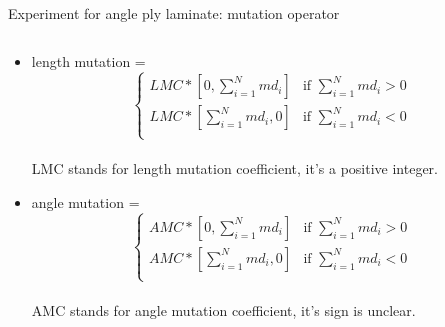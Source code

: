 \documentclass{beamer}
\begin{document}
\begin{frame}{Experiment for angle ply laminate: mutation operator}
    \begin{columns}[c]
	\begin{column}{1\textwidth}
		\begin{itemize}
			\item length mutation =  
				\[
				  \begin{cases}
					  LMC*[0, \sum_{i=1}^{N}{md_i}] & \text{if $\sum_{i=1}^{N}{md_i} > 0$} \\
					  LMC*[\sum_{i=1}^{N}{md_i}, 0] & \text{if $\sum_{i=1}^{N}{md_i} < 0$} \\
				  \end{cases}
				\] \\
				LMC stands for length mutation coefficient, it's a positive integer.
			\item angle mutation = 
				\[
				  \begin{cases}
					  AMC*[0, \sum_{i=1}^{N}{md_i}] & \text{if $\sum_{i=1}^{N}{md_i} > 0$} \\
					  AMC*[\sum_{i=1}^{N}{md_i}, 0] & \text{if $\sum_{i=1}^{N}{md_i} < 0$} \\
				  \end{cases}
				\] \\
				AMC stands for angle mutation coefficient, it's sign is unclear.
		\end{itemize}
	\end{column}
\end{columns}
\end{frame}
\end{document}
